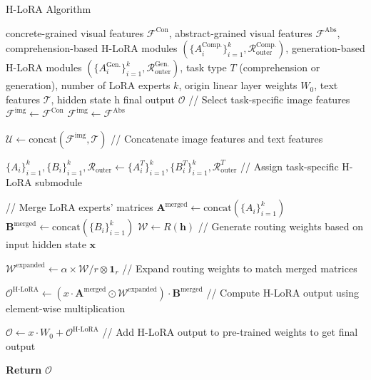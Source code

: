 \begin{algorithm}[h]
   \caption{H-LoRA Algorithm}
   \label{alg:h-lora}
\begin{algorithmic}
    concrete-grained visual features $\mathcal{F}^\text{Con}$, abstract-grained visual features $\mathcal{F}^\text{Abs}$, comprehension-based H-LoRA modules $(\{A_i^\text{Comp.}\}_{i=1}^k, \mathcal{R}_\text{outer}^\text{Comp.})$, generation-based H-LoRA modules $(\{A_i^\text{Gen.}\}_{i=1}^k, \mathcal{R}_\text{outer}^\text{Gen.})$, task type $T$ (comprehension or generation), number of LoRA experts $k$, origin linear layer weights $W_0$, text features $\mathcal{T}$, hidden state h
    final output $\mathcal{O}$
   \STATE // Select task-specific image features
       \STATE $\mathcal{F}^{\text{img}} \gets \mathcal{F}^{\text{Con}}$
       \STATE $\mathcal{F}^{\text{img}} \gets \mathcal{F}^{\text{Abs}}$
   \ENDIF

   \STATE $\mathcal{U} \gets \text{concat}(\mathcal{F}^{\text{img}}, \mathcal{T})$ // Concatenate image features and text features

   \STATE $\{A_i\}_{i=1}^{k}, \{B_i\}_{i=1}^{k},\mathcal{R}_\text{outer}  \gets \{A_i^T\}_{i=1}^{k}, \{B_i^T\}_{i=1}^{k},\mathcal{R}^T_\text{outer}$ // Assign task-specific H-LoRA submodule

   \STATE // Merge LoRA experts' matrices
   \STATE $\mathbf{A}^{\text{merged}} \gets \text{concat}(\{A_i\}_{i=1}^{k})$
   \STATE $\mathbf{B}^{\text{merged}} \gets \text{concat}(\{B_i\}_{i=1}^{k})$
   \STATE $\mathcal{W} \gets R(\mathbf{h})$ // Generate routing weights based on input hidden state $\mathbf{x}$

   \STATE $\mathcal{W}^\text{expanded} \gets \alpha \times \mathcal{W} / r \otimes \mathbf{1}_r$ // Expand routing weights to match merged matrices

   \STATE $\mathcal{O}^\text{H-LoRA} \gets (x \cdot \mathbf{A}^{\text{merged}} \odot \mathcal{W}^\text{expanded}) \cdot \mathbf{B}^{\text{merged}}$ // Compute H-LoRA output using element-wise multiplication

   \STATE $\mathcal{O} \gets x \cdot W_0 + \mathcal{O}^\text{H-LoRA}$ // Add H-LoRA output to pre-trained weights to get final output

   \STATE \textbf{Return} $\mathcal{O}$

\end{algorithmic}
\end{algorithm}

